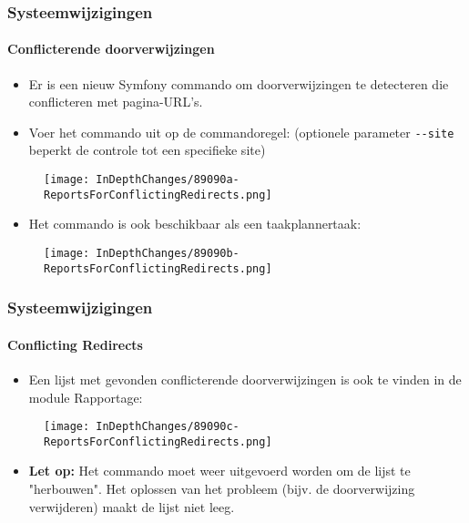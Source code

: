 \begin{frame}[fragile]
	\frametitle{Systeemwijzigingen}
	\framesubtitle{Conflicterende doorverwijzingen}

	\begin{itemize}
		\item Er is een nieuw Symfony commando om doorverwijzingen te detecteren
			die conflicteren met pagina-URL's.
		\item Voer het commando uit op de commandoregel:\newline
			\smaller
				(optionele parameter \texttt{-}\texttt{-site} beperkt de controle tot een specifieke site)
			\normalsize
	\end{itemize}

	\begin{figure}
		\texttt{[image: InDepthChanges/89090a-ReportsForConflictingRedirects.png]}
	\end{figure}

	\begin{itemize}
		\item Het commando is ook beschikbaar als een taakplannertaak:
	\end{itemize}

	\begin{figure}
		\texttt{[image: InDepthChanges/89090b-ReportsForConflictingRedirects.png]}
	\end{figure}

\end{frame}


\begin{frame}[fragile]
	\frametitle{Systeemwijzigingen}
	\framesubtitle{Conflicting Redirects}

	\begin{itemize}
		\item Een lijst met gevonden conflicterende doorverwijzingen is ook te vinden in de module Rapportage:
	\end{itemize}

	\begin{figure}
		\texttt{[image: InDepthChanges/89090c-ReportsForConflictingRedirects.png]}
	\end{figure}

	\begin{itemize}
		\item
			\small\textbf{Let op:}
				Het commando moet weer uitgevoerd worden om de lijst te "herbouwen".
				Het oplossen van het probleem (bijv. de doorverwijzing verwijderen) maakt de lijst niet leeg.
			\normalsize
	\end{itemize}

\end{frame}

